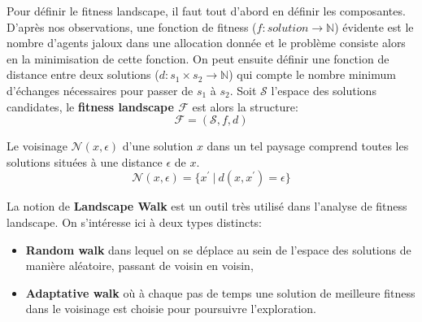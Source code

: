 \documentclass[../main.tex]{subfiles}
\begin{document}
\begin{definition}
	    Pour définir le fitness landscape, il faut tout d'abord en définir les composantes. D'après nos observations, une fonction de fitness ($f : solution \rightarrow \mathbb{N}$) évidente est le nombre d'agents jaloux dans une allocation donnée et le problème consiste alors en la minimisation de cette fonction. On peut ensuite définir une fonction de distance entre deux solutions ($d : s_1 \times s_2 \rightarrow \mathbb{N}$) qui compte le nombre minimum d'échanges nécessaires pour passer de $s_1$ à $s_2$. Soit $\mathcal{S}$ l'espace des solutions candidates, le \textbf{fitness landscape $\mathcal{F}$} est alors la structure:
	\begin{equation*}
	    \mathcal{F} = (\mathcal{S}, f, d)
	\end{equation*}
\end{definition}
\begin{definition}
	Le voisinage $\mathcal{N}(x, \epsilon)$ d'une solution $x$ dans un tel paysage comprend toutes les solutions situées à une distance $\epsilon$ de $x$.
    \begin{equation*}
        \mathcal{N}(x, \epsilon) = \{x^\prime~|~d(x, x^\prime) = \epsilon\}
    \end{equation*}
\end{definition}
\begin{definition}
	\label{def-walk}
	La notion de \textbf{Landscape Walk} \cite{pitzer} est un outil très utilisé dans l'analyse de fitness landscape. On s'intéresse ici à deux types distincts: 
	\begin{itemize}
	    \item \textbf{Random walk} dans lequel on se déplace au sein de l'espace des solutions de manière aléatoire, passant de voisin en voisin,
	    \item \textbf{Adaptative walk} où à chaque pas de temps une solution de meilleure fitness dans le voisinage est choisie pour poursuivre l'exploration.
	\end{itemize}
	
\end{definition}
	
\end{document}
